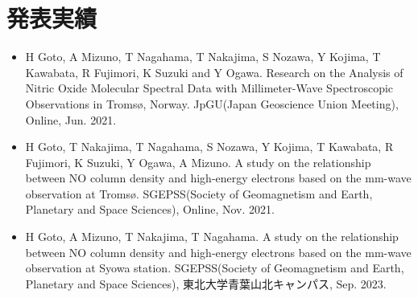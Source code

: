 \chapter{発表実績}
\begin{itemize}
    \item H Goto, A Mizuno, T Nagahama, T Nakajima, S Nozawa, Y Kojima, T Kawabata, R Fujimori, K Suzuki and Y Ogawa. Research on the Analysis of Nitric Oxide Molecular Spectral Data with Millimeter-Wave Spectroscopic Observations in Troms\o , Norway. JpGU(Japan Geoscience Union Meeting), Online, Jun. 2021.
    \item H Goto, T Nakajima, T Nagahama, S Nozawa, Y Kojima, T Kawabata, R Fujimori, K Suzuki, Y Ogawa, A Mizuno. A study on the relationship between NO column density and high-energy electrons based on the mm-wave observation at Troms\o . SGEPSS(Society of Geomagnetism and Earth, Planetary and Space Sciences), Online, Nov. 2021.
    \item H Goto, A Mizuno, T Nakajima, T Nagahama. A study on the relationship between NO column density and high-energy electrons based on the mm-wave observation at Syowa station. SGEPSS(Society of Geomagnetism and Earth, Planetary and Space Sciences), 東北大学青葉山北キャンパス, Sep. 2023.
\end{itemize}
